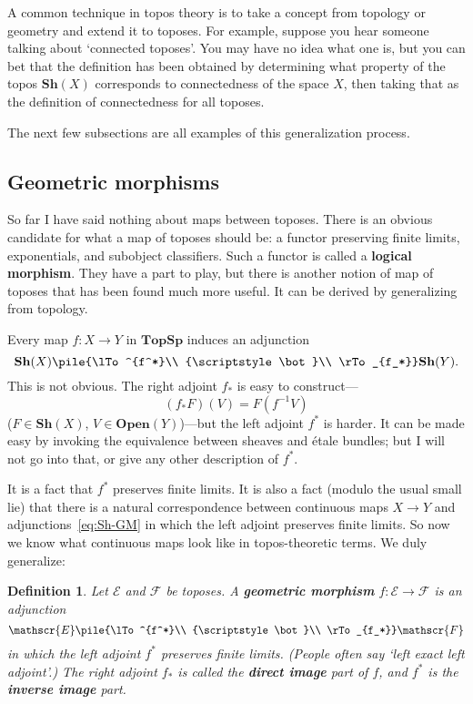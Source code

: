 \documentclass[12pt]{article}
\newcommand{\cat}[1]{\mathscr{#1}}
\newcommand{\fcat}[1]{\mathbf{#1}}
\newcommand{\demph}[1]{\textbf{\textup{#1}}}
\newcommand{\chunk}[1]{\subsection*{#1}}
\newcommand{\E}{\cat{E}}
\newcommand{\F}{\cat{F}}
\newcommand{\Sh}{\fcat{Sh}}
\newcommand{\Open}{\fcat{Open}}
\newcommand{\TopSp}{\fcat{TopSp}}
\newcommand{\dbot}{{\scriptstyle\bot}}
\newcommand{\cln}{\colon}
\newtheorem{predefn}[thm]{Definition}
\newenvironment{defn}{\begin{predefn}\upshape}{\end{predefn}}
\begin{document}
A common technique in topos theory is to take a concept from topology or
geometry and extend it to toposes.  For example, suppose you hear someone
talking about `connected toposes'.  You may have no idea what one is, but you
can bet that the definition has been obtained by determining what
property of the topos $\Sh(X)$ corresponds to connectedness of the space
$X$, then taking that as the definition of connectedness for all toposes.

The next few subsections are all examples of this generalization process.  


\chunk{Geometric morphisms}


So far I have said nothing about maps between toposes.  There is an obvious
candidate for what a map of toposes should be: a functor preserving finite
limits, exponentials, and subobject classifiers.  Such a functor is called a
\demph{logical morphism}.  They have a part to play, but there is another
notion of map of toposes that has been found much more useful.  It can be
derived by generalizing from topology.

Every map $f\cln X \to Y$ in $\TopSp$ induces an adjunction
% 
\begin{equation}        \label{eq:Sh-GM}
\Sh(X)
\pile{\lTo^{f^*}\\ \dbot\\ \rTo_{f_*}}
\Sh(Y).
\end{equation}
% 
This is not obvious.  The right adjoint $f_*$ is easy to construct---
\[
(f_* F)(V) = F(f^{-1} V)
\]
($F \in \Sh(X)$, $V \in \Open(Y)$)---but the left adjoint $f^*$ is harder.  It
can be made easy by invoking the equivalence between sheaves and \'etale
bundles; but I will not go into that, or give any other description of $f^*$.

It is a fact that $f^*$ preserves finite limits.  It is also a fact (modulo
the usual small lie) that there is a natural correspondence between continuous
maps $X \to Y$ and adjunctions~\eqref{eq:Sh-GM} in which the left adjoint
preserves finite limits.  So now we know what continuous maps look like in
topos-theoretic terms.  We duly generalize:

\begin{defn}    \label{defn:GM}
Let $\E$ and $\F$ be toposes.  A \demph{geometric morphism} $f\cln \E \to \F$
is an adjunction
\[
\E \pile{\lTo^{f^*}\\ \dbot\\ \rTo_{f_*}} \F
\]
in which the left adjoint $f^*$ preserves finite limits.  (People often say
`left exact left adjoint'.)  The right adjoint $f_*$ is called the
\demph{direct image} part of $f$, and $f^*$ is the \demph{inverse image} part.
\end{defn}
\end{document}

